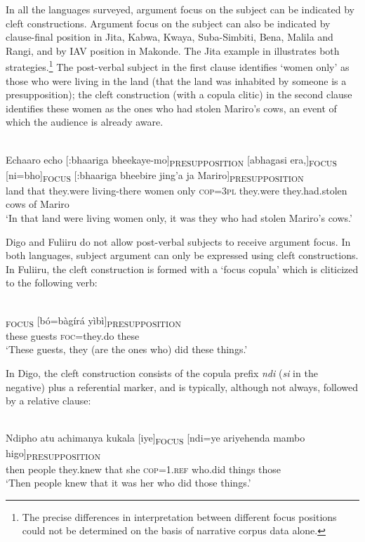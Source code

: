 \documentclass[output=paper]{langsci/langscibook}
\begin{document}
In all the languages surveyed, argument focus on the subject can be indicated by cleft constructions. Argument focus on the subject can also be indicated by clause-final position in Jita, Kabwa, Kwaya, Suba-Simbiti, Bena, Malila and Rangi, and by IAV position in Makonde. The Jita example in  illustrates both strategies.\footnote{The precise differences in interpretation between different focus positions could not be determined on the basis of narrative corpus data alone.} The post-verbal subject in the first clause identifies ‘women only’ as those who were living in the land (that the land was inhabited by someone is a presupposition); the cleft construction (with a copula clitic) in the second clause identifies these women as the ones who had stolen Mariro’s cows, an event of which the audience is already aware.

\ea\label{ex:20.nicolle}
\\
\gll Echaaro echo [:bhaariga bheekaye-mo]\textsubscript{PRESUPPOSITION} [abhagasi era,]\textsubscript{FOCUS} [ni=bho]\textsubscript{FOCUS} [:bhaariga bheebire jing’a ja Mariro]\textsubscript{PRESUPPOSITION}\\
land that {\db}they.were living-there {\db}women only {\db}\textsc{cop=3pl} {\db}they.were they.had.stolen cows of Mariro \\
\glt ‘In that land were living women only, it was they who had stolen Mariro’s cows.’
\z

Digo and Fuliiru do not allow post-verbal subjects to receive argument focus. In both languages, subject argument can only be expressed using cleft constructions. In Fuliiru, the cleft construction is formed with a ‘focus copula’ which is cliticized to the following verb:

\ea\label{ex:21.nicolle}
\\
\textsubscript{FOCUS} [bó=bàgírá yìbì]\textsubscript{PRESUPPOSITION}\\
{\db}these guests {\db}\textsc{foc}=they.do these \\
\glt ‘These guests, they (are the ones who) did these things.’
\z

In Digo, the cleft construction consists of the copula prefix \textit{ndi} (\textit{si} in the negative) plus a referential marker, and is typically, although not always, followed by a relative clause:

\ea\label{ex:22.nicolle}
\\
\gll Ndipho atu achimanya kukala [iye]\textsubscript{FOCUS} [ndi=ye ariyehenda mambo higo]\textsubscript{PRESUPPOSITION}\\
then people they.knew that {\db}she {\db}\textsc{cop=1.ref} who\textsc{.}did things those \\
\glt ‘Then people knew that it was her who did those things.’
\z
\end{document}
